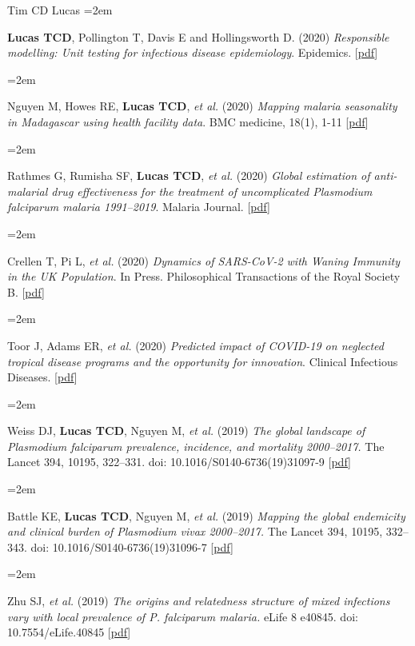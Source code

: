\documentclass{scrartcl}
\newcommand{\MarginText}[1]{\marginpar{\raggedleft\itshape\small#1}} %
\newcommand{\Description}[1]{\hangindent=2em\hangafter=0\noindent\raggedright\footnotesize{#1}\par\normalsize\vspace{1em}} %
\begin{document}
\begin{cv}{Tim {\Large CD} Lucas}
\Description{\textbf{Lucas TCD}, Pollington T, Davis E and Hollingsworth D. (2020) \emph{Responsible modelling: Unit testing for infectious disease epidemiology}. Epidemics. [\href{https://www.sciencedirect.com/science/article/pii/S1755436520300451}{pdf}]}



\Description{Nguyen M, Howes RE, \textbf{Lucas TCD},  \emph{et al.} (2020) \emph{Mapping malaria seasonality in Madagascar using health facility data}. BMC medicine, 18(1), 1-11 [\href{https://bmcmedicine.biomedcentral.com/track/pdf/10.1186/s12916-019-1486-3}{pdf}]}


\Description{Rathmes G, Rumisha SF, \textbf{Lucas TCD}, \emph{et al.} (2020) \emph{Global estimation of anti-malarial drug effectiveness for the treatment of uncomplicated \emph{Plasmodium falciparum} malaria 1991--2019}. Malaria Journal. [\href{https://link.springer.com/article/10.1186/s12936-020-03446-8}{pdf}]}

\Description{Crellen T, Pi L, \emph{et al.} (2020) \emph{Dynamics of SARS-CoV-2 with Waning Immunity in the UK Population}. In Press. Philosophical Transactions of the Royal Society B. [\href{https://www.medrxiv.org/content/10.1101/2020.07.24.20157982v1}{pdf}]}


\Description{Toor J, Adams ER, \emph{et al.} (2020) \emph{Predicted impact of COVID-19 on neglected tropical disease programs and the opportunity for innovation}. Clinical Infectious Diseases. [\href{https://www.ncbi.nlm.nih.gov/pmc/articles/PMC7543306/}{pdf}]}



\Description{\MarginText{2019}Weiss DJ, \textbf{Lucas TCD}, Nguyen M, \emph{et al.} (2019) \emph{The global landscape of \emph{Plasmodium falciparum} prevalence, incidence, and mortality 2000--2017.} The Lancet 394, 10195, 322--331. doi: 10.1016/S0140-6736(19)31097-9 [\href{https://doi.org/10.1016/S0140-6736(19)31097-9}{pdf}]}

\Description{Battle KE, \textbf{Lucas TCD},  Nguyen M, \emph{et al.} (2019) \emph{Mapping the global endemicity and clinical burden of \emph{Plasmodium vivax} 2000--2017.} The Lancet 394, 10195, 332--343. doi: 10.1016/S0140-6736(19)31096-7 [\href{https://doi.org/10.1016/S0140-6736(19)31096-7}{pdf}]}



\Description{Zhu SJ, \emph{et al.} (2019) \emph{The origins and relatedness structure of mixed infections vary with local prevalence of \emph{P. falciparum} malaria.} eLife 8 e40845. doi: 10.7554/eLife.40845 [\href{https://doi.org/10.7554/eLife.40845}{pdf}]}





\end{cv}
\end{document}
